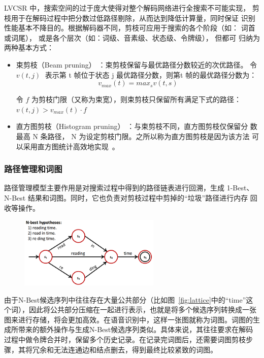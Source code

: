 LVCSR 中，搜索空间的过于庞大使得对整个解码网络进行全搜索不可能实现，
剪枝用于在解码过程中把分数过低路径剔除，从而达到降低计算量，同时保证
识别性能基本不降目的。根据解码器不同，剪枝可应用于搜索的各个阶段（如：
词首或词尾）， 或是各个层次（如：词级、音素级、状态级、令牌级）， 但都可
归纳为两种基本方式：
\begin{itemize}
\item 束剪枝（Beam pruning） ：束剪枝保留与最优路径分数较近的次优路径。
令 $v(t,j)$ 表示第 t 帧位于状态 j 最优路径分数，则第t 帧的最优路径分数为：
\begin{equation}
v_{max}(t)=max_s v(t,s)
\end{equation}

令 $f$ 为剪枝门限（又称为束宽），则束剪枝只保留所有满足下式的路径：
$v(t,j)>v_{max}(t)\cdot f$
\item 直方图剪枝（Histogram pruning） ：与束剪枝不同，直方图剪枝仅保留分
数最高 N 条路径， N 为设定剪枝门限。之所以称为直方图剪枝是因为该方法
可以采用直方图统计高效地实现~\cite{pylkkonen2005new}。
\end{itemize}

\subsubsection{路径管理和词图}

路径管理模型主要作用是对搜索过程中得到的路径链表进行回溯，生成 1-Best、
N-Best 结果和词图。同时，它也负责对剪枝过程中剪掉的“垃圾”路径进行内存
回收等操作。

\begin{figure}[!htp]
  \centering
    \captionstyle{\centering}
    \includegraphics[clip=true, width=0.6\textwidth]{figure/lattice.png}
\end{figure}


由于N-Best候选序列中往往存在大量公共部分（比如图~\ref{fig:lattice}中的“time”这个词），因此将公共部分压缩在一起进行表示，也就是将多个候选序列转换成一张图来进行存储，将会更加高效。在语音识别中，这样一张图就称为词图。词图的生成所带来的额外操作与生成N-Best候选序列类似。具体来说，其往往要求在解码过程中做令牌合并时，保留多个历史记录。在记录完词图后，还需要词图剪枝步骤，其将冗余和无法连通边和结点删去，得到最终比较紧致的词图。

